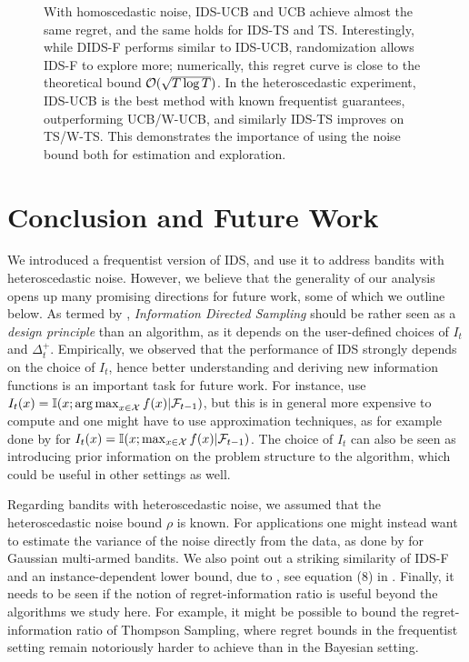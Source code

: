 \begin{figure}
	\hspace{-10pt}
	\caption{With homoscedastic noise, IDS-UCB and UCB achieve almost the same regret, and the same holds for IDS-TS and TS. Interestingly, while DIDS-F performs similar to IDS-UCB, randomization allows IDS-F to explore more; numerically, this regret curve is close to the theoretical bound $\mathcal{O}(\sqrt{T\log T})$. In the heteroscedastic experiment, IDS-UCB is the best method with known frequentist guarantees, outperforming UCB/W-UCB, and similarly IDS-TS improves on TS/W-TS. This  demonstrates the importance of using the noise bound both for estimation and exploration.}
\end{figure}


\section{Conclusion and Future Work}\label{section: future work} 
We introduced a frequentist version of IDS, and use it to address bandits with heteroscedastic noise. However, we believe that the generality of our analysis opens up many promising directions for future work, some of which we outline below. As termed by \cite{RussoLearningOptimizeInformationDirected2014}, \emph{Information Directed Sampling} should be rather seen as a \emph{design principle} than an algorithm, as it depends on the user-defined choices of $I_t$ and $\Delta_t^+$. Empirically, we  observed that the performance of IDS strongly depends on the choice of $I_t$, hence better understanding and deriving new information functions is an important task for future work. For instance, \cite{RussoLearningOptimizeInformationDirected2014} use \linebreak $I_t(x) = \mathbb{I}(x; \operatorname*{arg\,max}_{x \in \mathcal{X}} f(x)|\mathcal{F}_{t-1})$, but this is in general more expensive to compute and one might have to use approximation techniques, as for example done by \cite{WangMaxvalueEntropySearch2017} for $I_t(x) = \mathbb{I}(x; \max_{x \in \mathcal{X}} f(x)|\mathcal{F}_{t-1})$. The choice of $I_t$ can also be seen as introducing prior information on the problem structure to the algorithm, which could be useful in other settings as well.

Regarding bandits with heteroscedastic noise, we assumed that the heteroscedastic noise bound $\rho$ is known. For applications one might instead want to estimate the variance of the noise directly from the data, as done by \cite{CowanNormalBanditsUnknown2015} for Gaussian multi-armed bandits. We also point out a striking similarity of IDS-F and an instance-dependent lower bound, due to \cite{BurnetasOptimaladaptivepolicies1996}, see equation (8) in \citep{CowanNormalBanditsUnknown2015}. Finally, it needs to be seen if the notion of regret-information ratio is useful beyond the algorithms we study here. For example, it might be possible to bound the regret-information ratio of Thompson Sampling, where regret bounds in the frequentist setting remain notoriously harder to achieve than in the Bayesian setting. 


